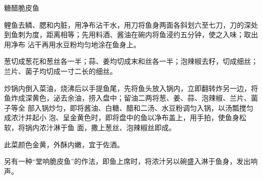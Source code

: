 %
%
%
%
%
%
%
\begin{recipe}{糖醋脆皮鱼}

\ingredients


\preparation

\step 鲤鱼去鳞、腮和内脏，用净布沾干水，用刀将鱼身两面各斜划六至七刀，刀的深处
到鱼刺为度，距离相等；先用料酒、酱油在碗内将鱼浸约五分钟，使之入味；取出用净布
沾干再用水豆粉均匀地涂在鱼身上。

\step 葱切成葱花和葱丝各一半；蒜、姜均切成末和丝各一半；泡辣椒去籽，切成细丝；
兰片、菌子均切成一寸二长的细丝。

\step 炒锅内倒入菜油，烧沸后以手提鱼尾，先将鱼头放入锅内，立即翻转炸另一边，将
鱼炸成深黄色，泌去余油，捞入盘中；留油二两将葱、姜、蒜、泡辣椒、兰片、菌子等全
部入锅炒匀，即将酱油、白糖、醋和二汤、水豆粉调匀入锅，以汤瓢搅匀成浓汁并起小
泡、呈金黄色时，即将盘中的鱼以净布盖上，用手拍，使鱼身松软，将锅内浓汁淋于鱼
面，撒上葱丝、泡辣椒丝即成。

\features

此菜颜色金黄，外酥内嫩，宜于佐酒。

另有一种“堂响脆皮鱼”的作法，即鱼上席时，将浓汁另以碗盛入淋于鱼身，发出响声。

\end{recipe}

